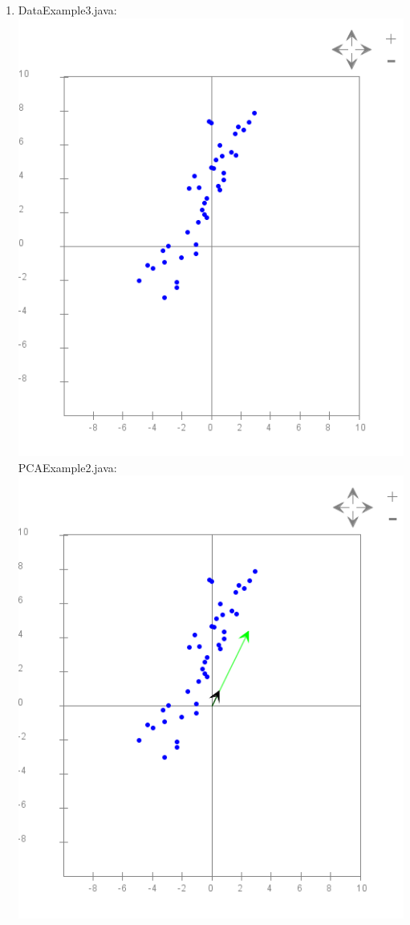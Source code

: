 \documentclass{article}
\begin{document}
\begin{enumerate}
\item DataExample3.java: \\
\includegraphics[scale=0.3]{exercise19_1}\\
PCAExample2.java: \\
\includegraphics[scale=0.3]{exercise19_2}


\end{enumerate}
\end{document}
